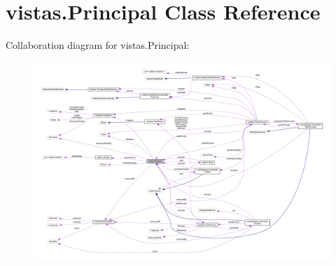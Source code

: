 \hypertarget{classvistas_1_1_principal}{}\section{vistas.\+Principal Class Reference}
\label{classvistas_1_1_principal}


Collaboration diagram for vistas.\+Principal\+:\nopagebreak
\begin{figure}[H]
\begin{center}
\leavevmode
\includegraphics[width=350pt]{classvistas_1_1_principal__coll__graph}
\end{center}
\end{figure}
